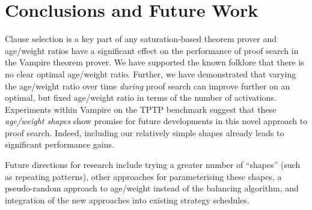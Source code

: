 \documentclass{llncs}
\begin{document}
\section{Conclusions and Future Work}
\label{sec:conclusions}

Clause selection is a key part of any saturation-based theorem prover and age/weight ratios have a significant effect on the performance of proof search in the Vampire theorem prover. We have supported the known folklore that there is no clear optimal age/weight ratio.
Further, we have demonstrated that varying the age/weight ratio over time \emph{during} proof search can improve further on an optimal, but fixed age/weight ratio in terms of the number of activations.
Experiments within Vampire on the TPTP benchmark suggest that these \emph{age/weight shapes} show promise for future developments in this novel approach to proof search. Indeed, including our relatively simple shapes already leads to significant performance gains.

Future directions for research include trying a greater number of ``shapes'' (such as repeating patterns), other approaches for parameterising these shapes, a pseudo-random approach to age/weight instead of the balancing algorithm, and integration of the new approaches into existing strategy schedules.


\end{document}
